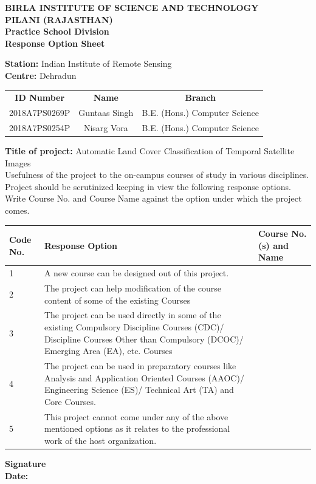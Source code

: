 \documentclass[12pt, a4paper]{report}
\begin{document}
	\begin{center}  
	\textbf {BIRLA INSTITUTE OF SCIENCE AND TECHNOLOGY\\
	PILANI (RAJASTHAN)\\
	Practice School Division\\
	Response Option Sheet}
	\end{center}
	\begin{onehalfspace}
	\textbf{Station:} Indian Institute of Remote Sensing \\
	\textbf{Centre:} Dehradun
	\begin{center}
	\begin{tabular}{c c c}
	\textbf{ID Number} & \textbf{Name} & \textbf{Branch} \\
	2018A7PS0269P & Guntaas Singh & B.E. (Hons.) Computer Science \\
	2018A7PS0254P & Nisarg Vora  & B.E. (Hons.) Computer Science \\
	\end{tabular} 
	\end{center}
	\textbf{Title of project:} Automatic Land Cover Classification of Temporal Satellite Images\\
	\vspace*{1cm}
	Usefulness of the project to the on-campus courses of study in various disciplines. Project should be scrutinized keeping in view the following response options. Write Course No. and Course Name against the option under which the project comes.\\
	\begin{center}
	\begin{tabular}{|p{1cm}|p{10cm}|p{3cm}|}
	\hline
	\textbf{Code No.} & \textbf{Response Option} & \textbf{Course No.(s) and Name} \\
	\hline
	1 & A new course can be designed out of this project. & ~\\
	\hline
	2 & The project can help modification of the course content of some of the existing Courses & ~\\
	\hline
	3 & The project can be used directly in some of the existing Compulsory Discipline Courses (CDC)/ Discipline Courses Other than Compulsory (DCOC)/ Emerging Area (EA), etc. Courses & ~\\
	\hline
	4 & The project can be used in preparatory courses like Analysis and Application Oriented Courses (AAOC)/ Engineering Science (ES)/ Technical Art (TA) and Core Courses. & ~\\
	\hline
	5 & This project cannot come under any of the above mentioned options as it relates to the professional work of the host organization. &~ \\
	\hline
	\end{tabular} 
	\end{center}
	\end{onehalfspace}
	\vspace*{0.5cm}
	\textbf{Signature}\\
	\textbf{Date: }
	\newpage
\end{document}
